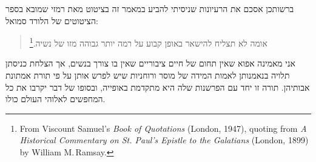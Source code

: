 \documentclass[12pt, extrafontsizes, twopage, a5paper]{memoir}
\begin{document}
ברשותכן אסכם את הרעיונות שניסיתי להביע במאמר זה בציטוט מאת רמזי שמובא בספר הציטוטים של הלורד סמואל:

\begin{quote}
אומה לא תצליח להישאר באופן קבוע על רמה יותר גבוהה מזו של נשיה.\footnote{\textenglish{From Viscount Samuel's \textsl{Book of
  Quotations} (London, 1947), quoting from \textsl{A Historical Commentary on St. Paul's Epistle to the Galatians} (London, 1899) by William M.\,Ramsay.}}
\end{quote}

אני מאמינה אפוא שאין תחום של חיים ציבוריים שאין בו צורך בנשים, אך הצלחת כניסתן תלויה בנאמנותן לאמות המידה של מוסר ורוחניות שיש לפרש אותן על פי תורת אמתונת אבותיהן. תורה זו יחד עם הפרשנות שלה היא מתקדמת באופייה, ובסופו של דבר יקרבו את כל המחפשים לאלוהי העולם כולו.
\end{document}
